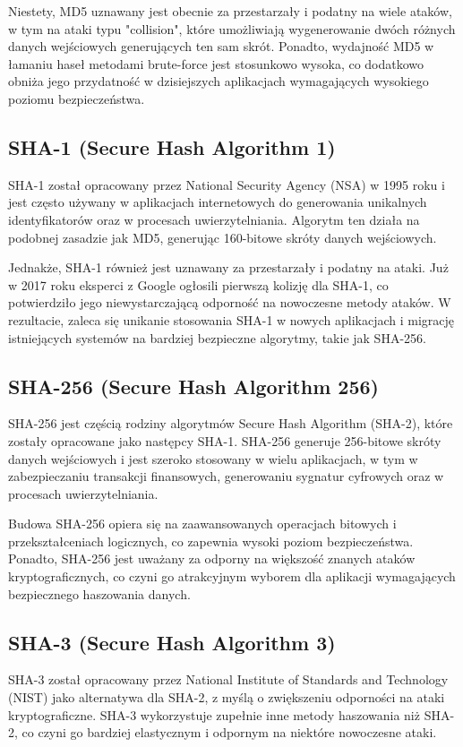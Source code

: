 \documentclass[10pt,a4paper]{article}
\begin{document}
Niestety, MD5 uznawany jest obecnie za przestarzały i podatny na wiele ataków, w tym na ataki typu "collision", które umożliwiają wygenerowanie dwóch różnych danych wejściowych generujących ten sam skrót. Ponadto, wydajność MD5 w łamaniu haseł metodami brute-force jest stosunkowo wysoka, co dodatkowo obniża jego przydatność w dzisiejszych aplikacjach wymagających wysokiego poziomu bezpieczeństwa.

\subsection{SHA-1 (Secure Hash Algorithm 1)}
SHA-1 został opracowany przez National Security Agency (NSA) w 1995 roku i jest często używany w aplikacjach internetowych do generowania unikalnych identyfikatorów oraz w procesach uwierzytelniania. Algorytm ten działa na podobnej zasadzie jak MD5, generując 160-bitowe skróty danych wejściowych.

Jednakże, SHA-1 również jest uznawany za przestarzały i podatny na ataki. Już w 2017 roku eksperci z Google ogłosili pierwszą kolizję dla SHA-1, co potwierdziło jego niewystarczającą odporność na nowoczesne metody ataków. W rezultacie, zaleca się unikanie stosowania SHA-1 w nowych aplikacjach i migrację istniejących systemów na bardziej bezpieczne algorytmy, takie jak SHA-256.

\subsection{SHA-256 (Secure Hash Algorithm 256)}
SHA-256 jest częścią rodziny algorytmów Secure Hash Algorithm (SHA-2), które zostały opracowane jako następcy SHA-1. SHA-256 generuje 256-bitowe skróty danych wejściowych i jest szeroko stosowany w wielu aplikacjach, w tym w zabezpieczaniu transakcji finansowych, generowaniu sygnatur cyfrowych oraz w procesach uwierzytelniania.

Budowa SHA-256 opiera się na zaawansowanych operacjach bitowych i przekształceniach logicznych, co zapewnia wysoki poziom bezpieczeństwa. Ponadto, SHA-256 jest uważany za odporny na większość znanych ataków kryptograficznych, co czyni go atrakcyjnym wyborem dla aplikacji wymagających bezpiecznego haszowania danych.

\subsection{SHA-3 (Secure Hash Algorithm 3)}
SHA-3 został opracowany przez National Institute of Standards and Technology (NIST) jako alternatywa dla SHA-2, z myślą o zwiększeniu odporności na ataki kryptograficzne. SHA-3 wykorzystuje zupełnie inne metody haszowania niż SHA-2, co czyni go bardziej elastycznym i odpornym na niektóre nowoczesne ataki.
\end{document}
